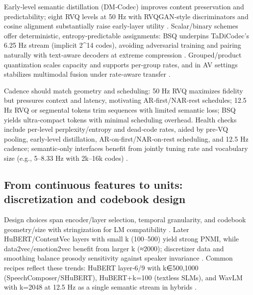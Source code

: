 \documentclass{article}
\begin{document}
Early‑level semantic distillation (DM‑Codec) improves content preservation and predictability; eight RVQ levels at 50 Hz with RVQGAN‑style discriminators and cosine alignment substantially raise early‑layer utility \cite{ahasan2025dmcodecdistillingmultimodalrepresentatio}. Scalar/binary schemes offer deterministic, entropy‑predictable assignments: BSQ underpins TaDiCodec’s 6.25 Hz stream (implicit 2^{14} codes), avoiding adversarial training and pairing naturally with text‑aware decoders at extreme compression \cite{wang2025tadicodectextawarediffusionspeechtokeniz}. Grouped/product quantization scales capacity and supports per‑group rates, and in AV settings stabilizes multimodal fusion under rate‑aware transfer \cite{sadok2025vectorquantizedmaskedautoencoderaudiovis}.

Cadence should match geometry and scheduling: 50 Hz RVQ maximizes fidelity but pressures context and latency, motivating AR‑first/NAR‑rest schedules; 12.5 Hz RVQ or segmental tokens trim sequences with limited semantic loss; BSQ yields ultra‑compact tokens with minimal scheduling overhead. Health checks include per‑level perplexity/entropy and dead‑code rates, aided by pre‑VQ pooling, early‑level distillation, AR‑on‑first/NAR‑on‑rest scheduling, and 12.5 Hz cadence; semantic‑only interfaces benefit from jointly tuning rate and vocabulary size (e.g., 5–8.33 Hz with 2k–16k codes) \cite{peng2024mslms2stmultitaskspeechlanguagemodeltext,zeng2024scalingspeechtextpretrainingsyntheticint,yang2025diffsoundstreamefficientspeechtokenizati,wang2025tadicodectextawarediffusionspeechtokeniz,ahasan2025dmcodecdistillingmultimodalrepresentatio,baade2024syllablelmlearningcoarsesemanticunitsspe}.

\subsection{From continuous features to units: discretization and codebook design} \label{subsec:From continuous features to units: discretization and codebook design}
Design choices span encoder/layer selection, temporal granularity, and codebook geometry/size with stringization for LM compatibility \cite{guo2025recentadvancesdiscretespeechtokensreview}. Later HuBERT/ContentVec layers with small k (100–500) yield strong PNMI, while data2vec/emotion2vec benefit from larger k (≈2000); discretizer data and smoothing balance prosody sensitivity against speaker invariance \cite{onda2025benchmarkingprosodyencodingdiscretespeec}. Common recipes reflect these trends: HuBERT layer‑6/9 with k∈{500,1000} (SpeechComposer/SHuBERT), HuBERT+k=100 (textless SLMs), and WavLM with k=2048 at 12.5 Hz as a single semantic stream in hybrids \cite{wu2024speechcomposerunifyingmultiplespeechtask,hsu2024exploringcontextlearningtextlessspeechla,yang2025diffsoundstreamefficientspeechtokenizati}.
\end{document}
